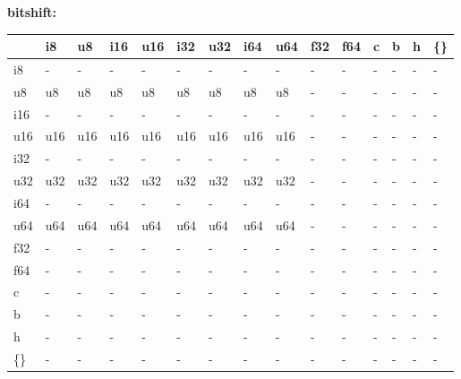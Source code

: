 \newpage
\textbf{bitshift:}
\begin{scriptsize}\begin{tt}\begin{center}\vspace{-.3cm}\begin{tabular}{|m{.65cm}||m{.65cm}|m{.65cm}|m{.65cm}|m{.65cm}|m{.65cm}|m{.65cm}|m{.65cm}|m{.65cm}|m{.65cm}|m{.65cm}|m{.65cm}|m{.65cm}|m{.65cm}|m{.65cm}|}\hline 
&i8&u8&i16&u16&i32&u32&i64&u64&f32&f64&c&b&h&\{\}\\ \hline \hline
i8&-&-&-&-&-&-&-&-&-&-&-&-&-&-\\ \hline
u8&u8&u8&u8&u8&u8&u8&u8&u8&-&-&-&-&-&-\\ \hline
i16&-&-&-&-&-&-&-&-&-&-&-&-&-&-\\ \hline
u16&u16&u16&u16&u16&u16&u16&u16&u16&-&-&-&-&-&-\\ \hline
i32&-&-&-&-&-&-&-&-&-&-&-&-&-&-\\ \hline
u32&u32&u32&u32&u32&u32&u32&u32&u32&-&-&-&-&-&-\\ \hline
i64&-&-&-&-&-&-&-&-&-&-&-&-&-&-\\ \hline
u64&u64&u64&u64&u64&u64&u64&u64&u64&-&-&-&-&-&-\\ \hline
f32&-&-&-&-&-&-&-&-&-&-&-&-&-&-\\ \hline
f64&-&-&-&-&-&-&-&-&-&-&-&-&-&-\\ \hline
c&-&-&-&-&-&-&-&-&-&-&-&-&-&-\\ \hline
b&-&-&-&-&-&-&-&-&-&-&-&-&-&-\\ \hline
h&-&-&-&-&-&-&-&-&-&-&-&-&-&-\\ \hline
\{\}&-&-&-&-&-&-&-&-&-&-&-&-&-&-\\ \hline
\end{tabular}\end{center}\end{tt}\end{scriptsize} 

